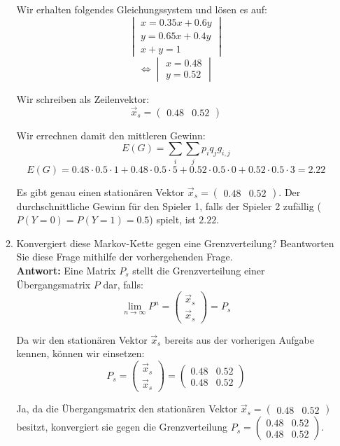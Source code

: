 \documentclass[12pt,a4paper]{article}
\begin{document}
\begin{enumerate}
\begin{enumerate}
Wir erhalten folgendes Gleichungssystem und lösen es auf:
$$\begin{vmatrix}
 x = 0.35x + 0.6y\\
 y = 0.65x + 0.4y\\
 x + y = 1
\end{vmatrix}$$
$$\Leftrightarrow \begin{vmatrix}
 x = 0.48\\
 y = 0.52
\end{vmatrix}$$

Wir schreiben als Zeilenvektor:
$$\vec x_s = \begin{pmatrix}
 0.48 & 0.52
\end{pmatrix}$$

Wir errechnen damit den mittleren Gewinn:
$$E(G) = \sum_i \sum_j p_i q_j g_{i,j}$$
$$E(G) = 0.48 \cdot 0.5 \cdot 1 + 0.48 \cdot 0.5 \cdot 5 + 0.52 \cdot 0.5 \cdot 0 + 0.52 \cdot 0.5 \cdot 3 = 2.22$$

Es gibt genau einen stationären Vektor $\vec x_s = \begin{pmatrix} 0.48 & 0.52 \end{pmatrix}$.
Der durchschnittliche Gewinn für den Spieler 1, falls der Spieler 2 zufällig ($P(Y=0)=P(Y=1)=0.5$) spielt, ist $2.22$.

\item Konvergiert diese Markov-Kette gegen eine Grenzverteilung? Beantworten Sie diese Frage mithilfe der vorhergehenden Frage.\\
\textbf{Antwort:} Eine Matrix $P_s$ stellt die Grenzverteilung einer Übergangsmatrix $P$ dar, falls:
$$\lim_{n \to \infty} P^n = \begin{pmatrix}
 \vec x_s\\
 \vec x_s
\end{pmatrix} = P_s$$

Da wir den stationären Vektor $\vec x_s$ bereits aus der vorherigen Aufgabe kennen, können wir einsetzen:
$$P_s = \begin{pmatrix}
 \vec x_s\\
 \vec x_s
\end{pmatrix} = \begin{pmatrix}
 0.48 & 0.52\\
 0.48 & 0.52
\end{pmatrix}$$

Ja, da die Übergangsmatrix den stationären Vektor $\vec x_s = \begin{pmatrix} 0.48 & 0.52 \end{pmatrix}$ besitzt, konvergiert sie gegen die Grenzverteilung $P_s = \begin{pmatrix}
 0.48 & 0.52\\
 0.48 & 0.52
\end{pmatrix}$.


\end{enumerate}
\end{enumerate}
\end{document}
